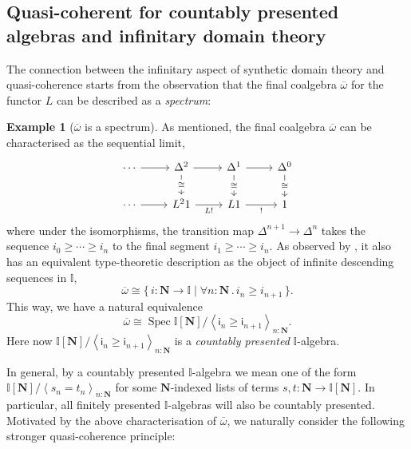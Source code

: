 \documentclass[a4paper,12pt]{amsart}
\theoremstyle{definition}
\newtheorem{example}[theorem]{Example}
\newcommand{\mb}[1]{\mathbf{#1}}
\newcommand{\mbb}[1]{\mathbb{#1}}
\newcommand{\I}{\mbb I}
\newcommand{\ms}[1]{\mathsf{#1}}
\newcommand{\ov}[1]{\overline{#1}}
\newcommand{\pair}[1]{\left\langle#1\right\rangle}
\newcommand{\scomp}[2]{\{\,#1\mid#2\,\}}
\newcommand{\N}{\mb N}
\newcommand{\fa}[2]{\forall #1\!\colon\!\!#2\mathpunct{.}}
\newcommand{\spec}{\operatorname{Spec}}
\begin{document}
\subsection{Quasi-coherent for countably presented algebras and infinitary domain theory}
The connection between the infinitary aspect of synthetic domain theory and quasi-coherence starts from the observation that the final coalgebra $\ov\omega$ for the functor $L$ can be described as a \emph{spectrum}:

\begin{example}[$\ov\omega$ is a spectrum]\label{exm:ovomegaaffine}
  As mentioned, the final coalgebra $\ov\omega$ can be characterised as the sequential limit,
  \[\begin{tikzcd}
    \cdots & {\Delta^2} & {\Delta^1} & {\Delta^0} \\
    \cdots & {L^21} & L1 & 1
    \arrow[from=1-1, to=1-2]
    \arrow[from=1-2, to=1-3]
    \arrow["\cong"{description}, from=1-2, to=2-2]
    \arrow[from=1-3, to=1-4]
    \arrow["\cong"{description}, from=1-3, to=2-3]
    \arrow["\cong"{description}, from=1-4, to=2-4]
    \arrow[from=2-1, to=2-2]
    \arrow["{L!}"', from=2-2, to=2-3]
    \arrow["{!}"', from=2-3, to=2-4]
  \end{tikzcd}\]
  where under the isomorphisms, the transition map $\Delta^{n+1} \to \Delta^n$ takes the sequence $i_0 \ge \cdots \ge i_n$ to the final segment $i_1 \ge \cdots \ge i_n$. As observed by \citet[Sec.\ 5.2]{hyland1990first}, it also has an equivalent type-theoretic description as the object of infinite descending sequences in $\I$,
  \[ \ov\omega \cong \scomp{i : \N \to \I}{\fa n\N i_n \ge i_{n+1}}\text{.} \]
  This way, we have a natural equivalence
  \[ \ov\omega \cong \spec\I[\N]/\pair{\ms{i}_n \ge \ms{i}_{n+1}}_{n:\N}\text{.} \]
  Here now $\I[\N]/\pair{\ms{i}_n \ge \ms{i}_{n+1}}_{n:\N}$ is a \emph{countably presented} $\I$-algebra.
\end{example}

In general, by a countably presented $\I$-algebra we mean one of the form $\I[\N]/\pair{s_n = t_n}_{n:\N}$ for some $\N$-indexed lists of terms $s,t \colon \N \to \I[\N]$. In particular, all finitely presented $\I$-algebras will also be countably presented. Motivated by the above characterisation of $\ov\omega$, we naturally consider the following stronger quasi-coherence principle:
\end{document}

